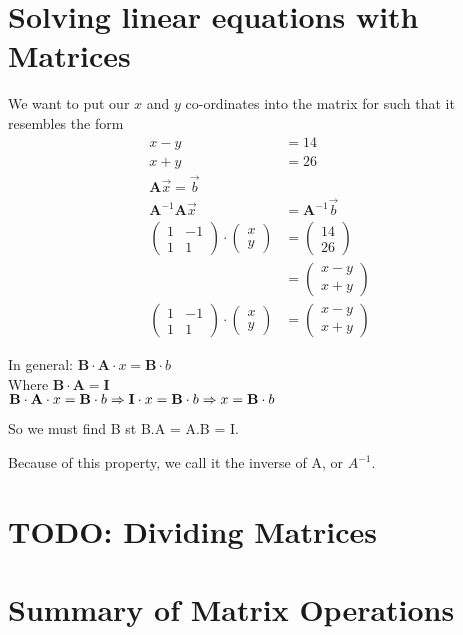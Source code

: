 \section{Solving linear equations with Matrices}
\label{sec:SolvingLinearEqsWithMatrices}
We want to put our $x$ and $y$ co-ordinates into the matrix for such that it
resembles the form
\begin{align}
  x -y &= 14 \\
  x +y &= 26 \\
\mathbf{A}\vec{x} = \vec{b} \\
\mathbf{A}^{-1}\mathbf{A}\vec{x} &= \mathbf{A}^{-1}\vec{b} \\
  \begin{pmatrix}
    1 & -1 \\
    1 & 1
  \end{pmatrix}
  \cdot
  \begin{pmatrix}
  x \\
  y
  \end{pmatrix}
  & =
  \begin{pmatrix}
  14 \\
  26
  \end{pmatrix}
  \\
  & =
  \begin{pmatrix}
  x-y \\
  x+y
  \end{pmatrix}
  \\
  \begin{pmatrix}
    1 & -1 \\
    1 & 1
  \end{pmatrix}
  \cdot
  \begin{pmatrix}
  x \\
  y
  \end{pmatrix}
  & =
  \begin{pmatrix}
  x-y \\
  x+y
  \end{pmatrix}
\end{align}

In general:
$\mathbf{B}\cdot\mathbf{A}\cdot x= \mathbf{B}\cdot b$ \\
Where $\mathbf{B}\cdot\mathbf{A} = \mathbf{I}$ \\
$\mathbf{B}\cdot\mathbf{A}\cdot x= \mathbf{B}\cdot b \Rightarrow \mathbf{I}\cdot
x = \mathbf{B}\cdot b \\
\Rightarrow x = \mathbf{B} \cdot b$

So we must find B st B.A = A.B = I.

Because of this property, we call it the inverse of A, or $A^{-1}$.

\section{TODO: Dividing Matrices}
\label{sec:DividingMatrices}

\section{Summary of Matrix Operations}
\label{sec:SummaryOfMatrixOperations}
